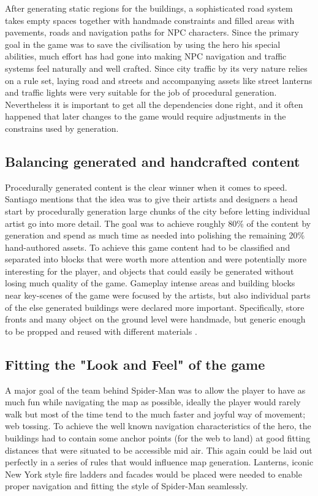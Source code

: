 \documentclass[a4paper]{article}
\begin{document}
After generating static regions for the buildings, a sophisticated road system takes empty spaces together with handmade constraints and filled areas with pavements, roads and navigation paths for NPC characters. Since the primary goal in the game was to save the civilisation by using the hero his special abilities, much effort has had gone into making NPC navigation and traffic systems feel naturally and well crafted. Since city traffic by its very nature relies on a rule set, laying road and streets and accompanying assets like street lanterns and traffic lights were very suitable for the job of procedural generation. Nevertheless it is important to get all the dependencies done right, and it often happened that later changes to the game would require adjustments in the constrains used by generation.

\subsection{Balancing generated and handcrafted content}

Procedurally generated content is the clear winner when it comes to speed. Santiago mentions that the idea was to give their artists and designers a head start by procedurally generation large chunks of the city before letting individual artist go into more detail. The goal was to achieve roughly 80\% of the content by generation and spend as much time as needed into polishing the remaining 20\% hand-authored assets.
To achieve this game content had to be classified and separated into blocks that were worth more attention and were potentially more interesting for the player, and objects that could easily be generated without losing much quality of the game.
Gameplay intense areas and building blocks near key-scenes of the game were focused by the artists, but also individual parts of the else generated buildings were declared more important.
Specifically, store fronts and many object on the ground level were handmade, but generic enough to be propped and reused with different materials \cite{gdc2019b}.

\subsection{Fitting the "Look and Feel" of the game}
\label{looknfeel}

A major goal of the team behind Spider-Man was to allow the player to have as much fun while navigating the map as possible, ideally the player would rarely walk but most of the time tend to the much faster and joyful way of movement; web tossing. To achieve the well known navigation characteristics of the hero, the buildings had to contain some anchor points (for the web to land) at good fitting distances that were situated to be accessible mid air. This again could be laid out perfectly in a series of rules that would influence map generation. Lanterns, iconic New York style fire ladders and facades would be placed were needed to enable proper navigation and fitting the style of Spider-Man seamlessly.
\end{document}
